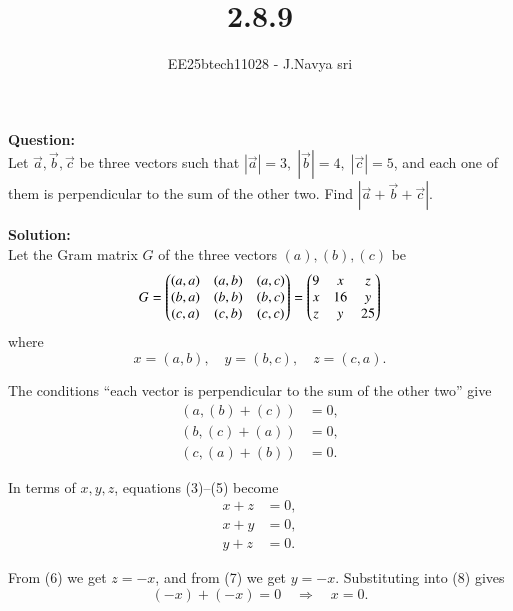 \documentclass[journal]{IEEEtran}
\begin{document}

\vspace{3cm}

\title{2.8.9}
\author{EE25btech11028 - J.Navya sri}
{\let\newpage\relax\maketitle}


\textbf{Question:} \\
Let $\vec{a}, \vec{b}, \vec{c}$ be three vectors such that 
$|\vec{a}|=3,\; |\vec{b}|=4,\; |\vec{c}|=5$, and each one of them is perpendicular to the sum of the other two. 
Find $|\vec{a}+\vec{b}+\vec{c}|$.

\bigskip

\textbf{Solution:} \\
Let the Gram matrix $G$ of the three vectors $(a), (b), (c)$ be
\begin{equation}
G = 
\begin{pmatrix}
(a,a) & (a,b) & (a,c) \\
(b,a) & (b,b) & (b,c) \\
(c,a) & (c,b) & (c,c)
\end{pmatrix}
=
\begin{pmatrix}
9 & x & z \\
x & 16 & y \\
z & y & 25
\end{pmatrix}
\end{equation}
where
\begin{equation}
x = (a,b), \quad y = (b,c), \quad z = (c,a).
\end{equation}

The conditions ``each vector is perpendicular to the sum of the other two'' give
\begin{align}
(a,(b)+(c)) &= 0, \\
(b,(c)+(a)) &= 0, \\
(c,(a)+(b)) &= 0.
\end{align}

In terms of $x,y,z$, equations (3)--(5) become
\begin{align}
x+z &= 0, \\
x+y &= 0, \\
y+z &= 0.
\end{align}

From (6) we get $z=-x$, and from (7) we get $y=-x$. Substituting into (8) gives
\begin{equation}
(-x)+(-x) = 0 \quad \Rightarrow \quad x=0.
\end{equation}
\end{document}
